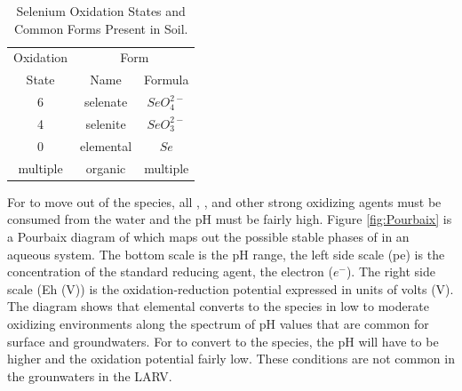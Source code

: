 \begin{linenumbers}[1]
\begin{table}[!htbp]
	\centering	
	\caption[Selenium Oxidation States and Common Forms Present in Soil.]{Selenium Oxidation States and Common Forms Present in Soil.}
	\label{tab:SeOxidationStates}
	\begin{tabular}{ccc}
		\toprule
		Oxidation & \multicolumn{2}{c}{Form}\\\cmidrule{2-3}
		State & Name & Formula \\
		\midrule
		6 & selenate & $SeO_4^{2-}$\\
		4 & selenite & $SeO_3^{2-}$\\
		0 & elemental & $Se$\\
		multiple & organic & multiple\\
		\bottomrule
	\end{tabular}
\end{table}

For \Se to move out of the \selenate species, all \dox, \nitrate, and other strong oxidizing agents must be consumed from the water and the pH must be fairly high.  Figure \ref{fig:Pourbaix} is a Pourbaix diagram of \Se which maps out the possible stable phases of \Se in an aqueous system.  The bottom scale is the pH range, the left side scale (pe) is the concentration of the standard reducing agent, the electron ($e^-$).  The right side scale (Eh (V)) is the oxidation-reduction potential expressed in units of volts (V).  The diagram shows that elemental \Se converts to the \selenate species in low to moderate oxidizing environments along the spectrum of pH values that are common for surface and groundwaters.  For \selenate to convert to the \selenite species, the pH will have to be higher and the oxidation potential fairly low.  These conditions are not common in the grounwaters in the LARV.


\end{linenumbers}

